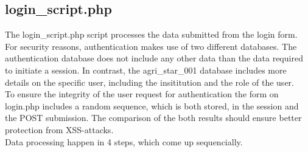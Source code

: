 \subsection{login\_script.php}\label{login_script}
The login\_script.php script processes the data submitted from the login form. For security reasons, 
authentication makes use of two different databases. The authentication database does not include any other data than the data required to initiate a session. In contrast,
the agri\_star\_001 database includes more details on the specific user, including the insititution and the role of the user.\\
To ensure the integrity of the user request for authentication the form on login.php includes a random sequence, which is both stored, in the session and the POST submission. 
The comparison of the both results should ensure better protection from XSS-attacks.\\
Data processing happen in 4 steps, which come up sequencially.
